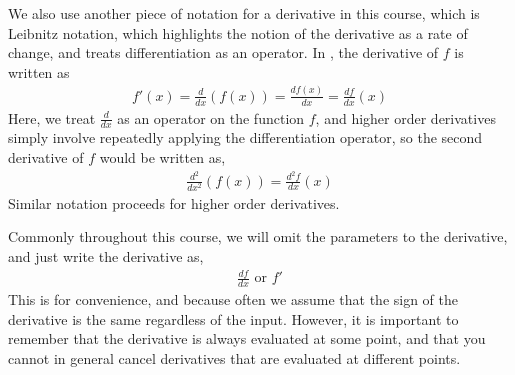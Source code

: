We also use another piece of notation for a derivative in this course, which is Leibnitz notation, which highlights the notion of the derivative as a rate of change, and treats differentiation as an operator. In , the derivative of $f$ is written as
\begin{align*}
    f'(x) = \frac{d}{dx}\left(f(x)\right) = \frac{df(x)}{dx} = \frac{df}{dx}(x)
\end{align*}
Here, we treat $\frac{d}{dx}$ as an operator on the function $f$, and higher order derivatives simply involve repeatedly applying the differentiation operator, so the second derivative of $f$ would be written as,
\begin{align*}
    \frac{d^2}{dx^2}(f(x)) = \frac{d^2 f}{dx}(x)
\end{align*}
Similar notation proceeds for higher order derivatives. 

Commonly throughout this course, we will omit the parameters to the derivative, and just write the derivative as,
\begin{align*}
    \frac{df}{dx} \text{ or } f'
\end{align*}
This is for convenience, and because often we assume that the sign of the derivative is the same regardless of the input. However, it is important to remember that the derivative is always evaluated at some point, and that you cannot in general cancel derivatives that are evaluated at different points. 

